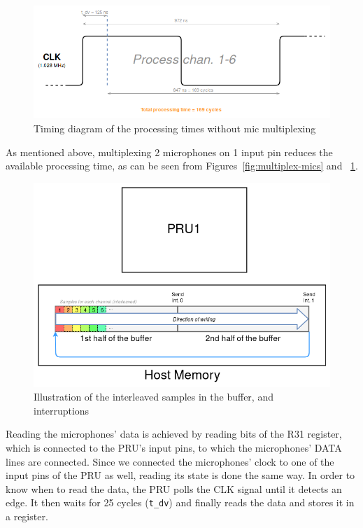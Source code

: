 \documentclass[]{report}
\begin{document}
\begin{figure}[h]
\centering
\includegraphics[width=1.0\linewidth]{Pictures/PRU_timing_diagram_no_mic_multiplexing.png}
\caption{Timing diagram of the processing times without mic
multiplexing}
\label{fig:nonmultiplex-mics}
\end{figure}

As mentioned above, multiplexing 2 microphones on 1 input pin reduces
the available processing time, as can be seen from Figures~\ref{fig:multiplex-mics} and ~\ref{fig:nonmultiplex-mics}.

\begin{figure}
\centering
\includegraphics[width=0.8\linewidth]{Pictures/PRU_buffer.png}
\caption{Illustration of the interleaved samples in the buffer, and
interruptions}
\end{figure}

Reading the microphones' data is achieved by reading bits of the R31 register, which is connected to the PRU's input pins, to which the microphones' DATA lines are connected. Since we connected the microphones' clock to one of the input pins of the PRU as well, reading its state is done the same way. In order to know when to read the data, the PRU polls the CLK signal until it detects an edge. It then waits for 25 cycles (\texttt{t\_dv}) and finally reads the data and stores it in a register.
\end{document}
